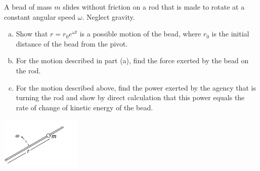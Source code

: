 \documentclass[12pt,letterpaper]{hmcpset}
\begin{document}
\begin{problem}
    A bead of mass $m$ slides without friction
    on a rod that is made to rotate at a constant
    angular speed $\omega$. Neglect gravity.
    \begin{enumerate}[(a)]
    \item Show that $r = r_{0} e^{\omega t}$ is a
        possible motion of the bead, where $r_{0}$
        is the initial distance of the bead from the
        pivot.
    \item For the motion described in part (a), find
        the force exerted by the bead on the rod.
    \item For the motion described above, find the
        power exerted by the agency that is turning
        the rod and show by direct calculation that
        this power equals the rate of change of kinetic
        energy of the bead.
    \end{enumerate}

    \begin{center}
        \includegraphics[width=1.5in]{img/7_22}
    \end{center}
\end{problem}

\begin{solution}
    \vfill
\end{solution}
\clearpage
\end{document}
